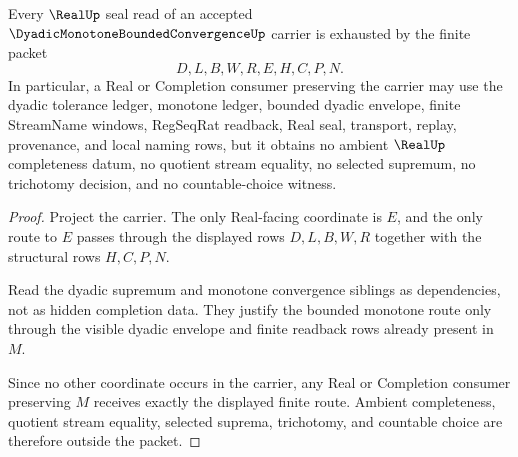 \begin{theorem}
\label{thm:dyadic-monotone-bounded-convergence-real-seal-nonescape}
Every $\RealUp$ seal read of an accepted $\DyadicMonotoneBoundedConvergenceUp$ carrier is exhausted by the finite packet
$$
D,L,B,W,R,E,H,C,P,N.
$$
In particular, a Real or Completion consumer preserving the carrier may use the dyadic tolerance ledger, monotone ledger, bounded dyadic envelope, finite StreamName windows, RegSeqRat readback, Real seal, transport, replay, provenance, and local naming rows, but it obtains no ambient $\RealUp$ completeness datum, no quotient stream equality, no selected supremum, no trichotomy decision, and no countable-choice witness.
\end{theorem}
\begin{proof}
Project the carrier. The only Real-facing coordinate is $E$, and the only route to $E$ passes through the displayed rows $D,L,B,W,R$ together with the structural rows $H,C,P,N$.

Read the dyadic supremum and monotone convergence siblings as dependencies, not as hidden completion data. They justify the bounded monotone route only through the visible dyadic envelope and finite readback rows already present in $M$.

Since no other coordinate occurs in the carrier, any Real or Completion consumer preserving $M$ receives exactly the displayed finite route. Ambient completeness, quotient stream equality, selected suprema, trichotomy, and countable choice are therefore outside the packet.
\end{proof}




